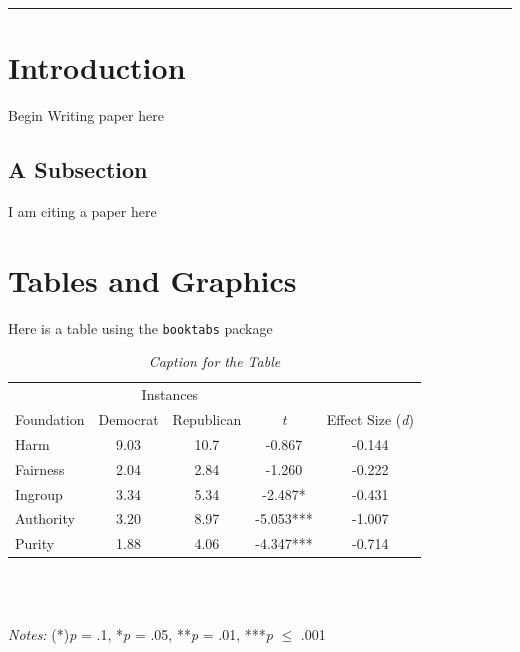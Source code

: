 \documentclass[12pt]{article}
\title{\tb{Paper Template}}
\author{Jennifer Lin}
\affil{Northwestern University}
\date{} %
\newcommand\e{\emph} %
\newcommand\txt{\texttt} %
\begin{document}
\begin{singlespace}
	\maketitle
\end{singlespace}

\begin{abstract}
	Sample Abstract
\end{abstract}

\begin{singlespace}
	\tableofcontents
\end{singlespace}

\noindent\rule[0.5ex]{\linewidth}{0.5pt}


\section{Introduction}

Begin Writing paper here

\subsection{A Subsection}

I am citing a paper here \cite{graham2009liberals}

\section{Tables and Graphics}

Here is a table using the \txt{booktabs} package

\begin{singlespace}
	

\begin{table}[H]
	\centering
	\caption{\e{Caption for the Table}}
	\label{table}
	\begin{tabular}{lcccc}
		\toprule
		&\multicolumn{2}{c}{Instances}&&\\
		\cmidrule{2-3}
		Foundation& Democrat &Republican &\e{t}& Effect Size (\e{d})\\
		\midrule
		Harm&9.03& 10.7&-0.867&-0.144\\
		Fairness&2.04&2.84&-1.260&-0.222\\
		Ingroup&3.34&5.34&-2.487*&-0.431\\
		Authority&3.20&8.97&-5.053***&-1.007\\
		Purity&1.88&4.06&-4.347***&-0.714\\
		\bottomrule
	\end{tabular} \\
	\begin{minipage}{10cm}
		~~\\
		\e{Notes:} 
		(*)\e{p} = .1, *\e{p} = .05, **\e{p} = .01, ***\e{p} $\leq$ .001
	\end{minipage}
\end{table}

\end{singlespace}
\end{document}
